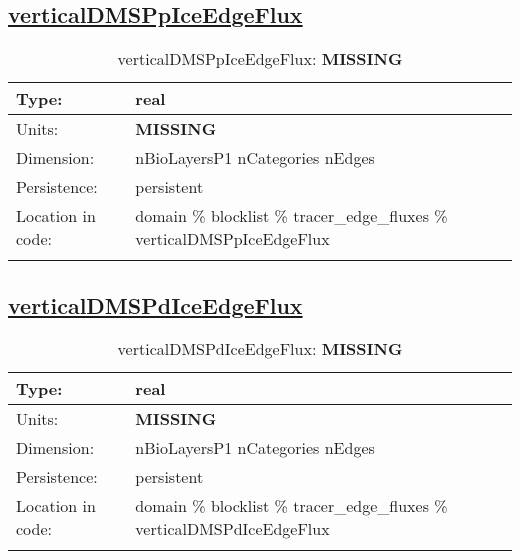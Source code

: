 \subsection[verticalDMSPpIceEdgeFlux]{\hyperref[sec:var_tab_tracer_edge_fluxes]{verticalDMSPpIceEdgeFlux}}
\label{subsec:var_sec_tracer_edge_fluxes_verticalDMSPpIceEdgeFlux}
\begin{center}
\begin{longtable}{| p{2.0in} | p{4.0in} |}
        \hline 
        Type: & real \\
        \hline 
        Units: & {\bf \color{red} MISSING} \\
        \hline 
        Dimension: & nBioLayersP1 nCategories nEdges \\
        \hline 
        Persistence: & persistent \\
        \hline 
         Location in code: & domain \% blocklist \% tracer\_edge\_fluxes \% verticalDMSPpIceEdgeFlux \\
         \hline 
    \caption{verticalDMSPpIceEdgeFlux: {\bf \color{red} MISSING}}
\end{longtable}
\end{center}
\subsection[verticalDMSPdIceEdgeFlux]{\hyperref[sec:var_tab_tracer_edge_fluxes]{verticalDMSPdIceEdgeFlux}}
\label{subsec:var_sec_tracer_edge_fluxes_verticalDMSPdIceEdgeFlux}
\begin{center}
\begin{longtable}{| p{2.0in} | p{4.0in} |}
        \hline 
        Type: & real \\
        \hline 
        Units: & {\bf \color{red} MISSING} \\
        \hline 
        Dimension: & nBioLayersP1 nCategories nEdges \\
        \hline 
        Persistence: & persistent \\
        \hline 
         Location in code: & domain \% blocklist \% tracer\_edge\_fluxes \% verticalDMSPdIceEdgeFlux \\
         \hline 
    \caption{verticalDMSPdIceEdgeFlux: {\bf \color{red} MISSING}}
\end{longtable}
\end{center}
